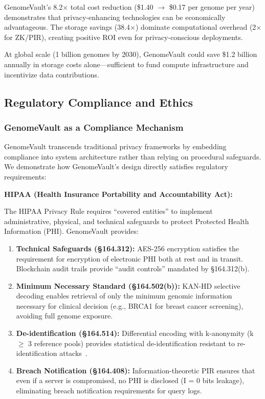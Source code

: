 \documentclass[12pt,a4paper]{article}
\begin{document}
GenomeVault's 8.2$\times$ total cost reduction (\$1.40 $\to$ \$0.17 per genome per year) demonstrates that privacy-enhancing technologies can be economically advantageous. The storage savings (38.4$\times$) dominate computational overhead (2$\times$ for ZK/PIR), creating positive ROI even for privacy-conscious deployments.

At global scale (1 billion genomes by 2030), GenomeVault could save \$1.2 billion annually in storage costs alone---sufficient to fund compute infrastructure and incentivize data contributions.

\subsection{Regulatory Compliance and Ethics}

\subsubsection{GenomeVault as a Compliance Mechanism}

GenomeVault transcends traditional privacy frameworks by embedding compliance into system architecture rather than relying on procedural safeguards. We demonstrate how GenomeVault's design directly satisfies regulatory requirements:

\textbf{HIPAA (Health Insurance Portability and Accountability Act):}

The HIPAA Privacy Rule requires ``covered entities'' to implement administrative, physical, and technical safeguards to protect Protected Health Information (PHI). GenomeVault provides:

\begin{enumerate}
\item \textbf{Technical Safeguards (§164.312):} AES-256 encryption satisfies the requirement for encryption of electronic PHI both at rest and in transit. Blockchain audit trails provide ``audit controls'' mandated by §164.312(b).
\item \textbf{Minimum Necessary Standard (§164.502(b)):} KAN-HD selective decoding enables retrieval of only the minimum genomic information necessary for clinical decision (e.g., BRCA1 for breast cancer screening), avoiding full genome exposure.
\item \textbf{De-identification (§164.514):} Differential encoding with k-anonymity (k $\geq$ 3 reference pools) provides statistical de-identification resistant to re-identification attacks~\cite{Homer2008, Gymrek2013}.
\item \textbf{Breach Notification (§164.408):} Information-theoretic PIR ensures that even if a server is compromised, no PHI is disclosed (I = 0 bits leakage), eliminating breach notification requirements for query logs.
\end{enumerate}
\end{document}
